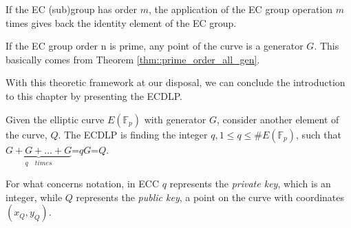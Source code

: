 \begin{myrem}
    If the EC (sub)group has order $m$, the application of the EC group operation $m$ times gives back the identity element of the EC group.
\end{myrem}
\begin{myrem}
    If the EC group order n is prime, any point of the curve is a generator $G$. This basically comes from Theorem \ref{thm::prime_order_all_gen}.
\end{myrem}
\noindent
With this theoretic framework at our disposal, we can conclude the introduction to this chapter by presenting the ECDLP.
\begin{mydef}
    Given the elliptic curve $E(\mathbb{F}_p)$ with generator $G$, consider another element of the curve, $Q$. The ECDLP is finding the integer $q, 1 \leq q \leq \#E(\mathbb{F}_p)$, such that $\underbrace{G+G+\dots+G}_{q \quad times}$=$qG$=$Q$.
\end{mydef}
\noindent
For what concerns notation, in ECC $q$ represents the \textit{private key}, which is an integer, while $Q$ represents the \textit{public key}, a point on the curve with coordinates $(x_Q, y_Q)$.

